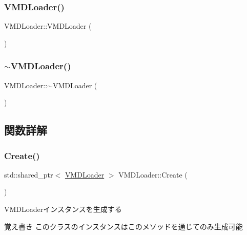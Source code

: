 \subsubsection{\texorpdfstring{V\+M\+D\+Loader()}{VMDLoader()}}
{\footnotesize\ttfamily V\+M\+D\+Loader\+::\+V\+M\+D\+Loader (\begin{DoxyParamCaption}{ }\end{DoxyParamCaption})}

\mbox{\label{class_v_m_d_loader_a57df015efb122fb3d04f73feac588c22}} 
\subsubsection{\texorpdfstring{$\sim$\+V\+M\+D\+Loader()}{~VMDLoader()}}
{\footnotesize\ttfamily V\+M\+D\+Loader\+::$\sim$\+V\+M\+D\+Loader (\begin{DoxyParamCaption}{ }\end{DoxyParamCaption})}



\subsection{関数詳解}
\mbox{\label{class_v_m_d_loader_a88df1c7388a466fca58b9245064b3207}} 
\subsubsection{\texorpdfstring{Create()}{Create()}}
{\footnotesize\ttfamily std\+::shared\+\_\+ptr$<$ \mbox{\hyperlink{class_v_m_d_loader}{V\+M\+D\+Loader}} $>$ V\+M\+D\+Loader\+::\+Create (\begin{DoxyParamCaption}{ }\end{DoxyParamCaption})\hspace{0.3cm}{\ttfamily [static]}}



V\+M\+D\+Loaderインスタンスを生成する 

\begin{DoxyNote}{覚え書き}
このクラスのインスタンスはこのメソッドを通じてのみ生成可能 
\end{DoxyNote}
\mbox{\label{class_v_m_d_loader_aef220a556a4f5279010e6b6385fc716b}} 
